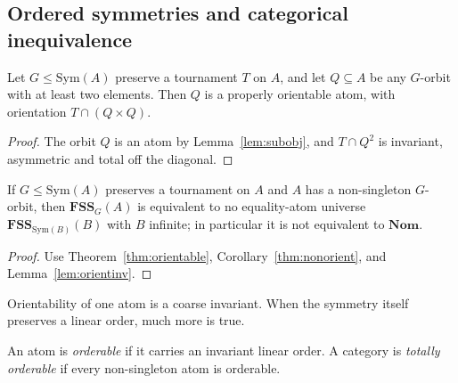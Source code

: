 \documentclass{lmcs}
\newcommand{\Sym}{\mathrm{Sym}}
\newcommand{\Nom}{\mathbf{Nom}}
\newcommand{\FSS}{\mathbf{FSS}}
\begin{document}
\subsection{Ordered symmetries and categorical inequivalence}

\begin{thm}\label{thm:orientable}
Let $G\leq\Sym(A)$ preserve a tournament $T$ on $A$, and let
$Q\subseteq A$ be any $G$-orbit with at least two elements. Then $Q$ is
a properly orientable atom, with orientation $T\cap(Q\times Q)$.
\end{thm}
\begin{proof}
The orbit $Q$ is an atom by Lemma~\ref{lem:subobj}, and
$T\cap Q^2$ is invariant, asymmetric and total off the diagonal.
\end{proof}

\begin{cor}\label{cor:noneq}
If $G\leq\Sym(A)$ preserves a tournament on $A$ and $A$ has a
non-singleton $G$-orbit, then $\FSS_G(A)$ is equivalent to no equality-atom
universe $\FSS_{\Sym(B)}(B)$ with $B$ infinite; in particular it is not
equivalent to $\Nom$.
\end{cor}
\begin{proof}
Use Theorem~\ref{thm:orientable}, Corollary~\ref{thm:nonorient}, and
Lemma~\ref{lem:orientinv}.
\end{proof}

Orientability of one atom is a coarse invariant. When the symmetry itself
preserves a linear order, much more is true.

\begin{defi}\label{defi:orderable}
An atom is \emph{orderable} if it carries an invariant linear order. A
category is \emph{totally orderable} if every non-singleton atom is
orderable.
\end{defi}
\end{document}
